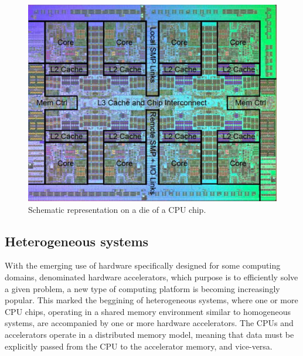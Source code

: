 \begin{figure}[!htp]
	\begin{center}
		\includegraphics[scale=4]{../../common/img/cpu_scheme.jpg}
		\caption{Schematic representation on a die of a CPU chip.}
		\label{fig:CPUChip}
	\end{center}
\end{figure}

\subsection{Heterogeneous systems}
\label{HeterogeneousSystems}

With the emerging use of hardware specifically designed for some computing domains, denominated hardware accelerators, which purpose is to efficiently solve a given problem, a new type of computing platform is becoming increasingly popular. This marked the beggining of heterogeneous systems, where one or more CPU chips, operating in a shared memory environment similar to homogeneous systems, are accompanied by one or more hardware accelerators. The CPUs and accelerators operate in a distributed memory model, meaning that data must be explicitly passed from the CPU to the accelerator memory, and vice-versa.


